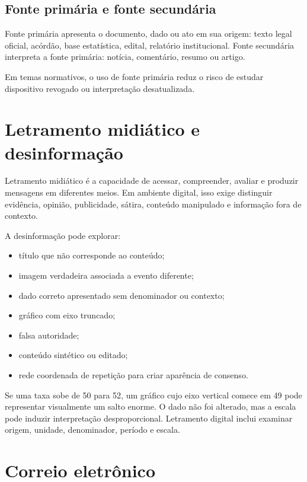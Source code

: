 \subsection{Fonte primária e fonte secundária}

Fonte primária apresenta o documento, dado ou ato em sua origem: texto legal oficial, acórdão, base estatística, edital, relatório institucional. Fonte secundária interpreta a fonte primária: notícia, comentário, resumo ou artigo.

Em temas normativos, o uso de fonte primária reduz o risco de estudar dispositivo revogado ou interpretação desatualizada.

\section{Letramento midiático e desinformação}

Letramento midiático é a capacidade de acessar, compreender, avaliar e produzir mensagens em diferentes meios. Em ambiente digital, isso exige distinguir evidência, opinião, publicidade, sátira, conteúdo manipulado e informação fora de contexto.

A desinformação pode explorar:
\begin{itemize}
\item título que não corresponde ao conteúdo;
\item imagem verdadeira associada a evento diferente;
\item dado correto apresentado sem denominador ou contexto;
\item gráfico com eixo truncado;
\item falsa autoridade;
\item conteúdo sintético ou editado;
\item rede coordenada de repetição para criar aparência de consenso.
\end{itemize}

\begin{exemplo}
Se uma taxa sobe de 50 para 52, um gráfico cujo eixo vertical comece em 49 pode representar visualmente um salto enorme. O dado não foi alterado, mas a escala pode induzir interpretação desproporcional. Letramento digital inclui examinar origem, unidade, denominador, período e escala.
\end{exemplo}

\section{Correio eletrônico}

